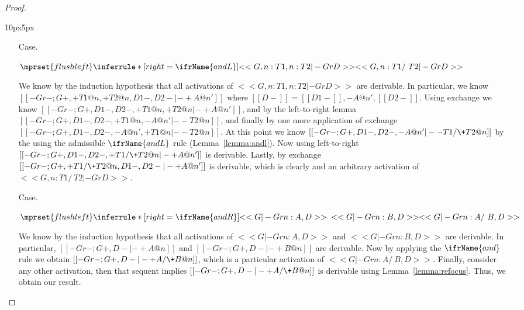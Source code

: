 \begin{proof}
\begin{changemargin}{10px}{5px}
\begin{itemize}
  \item[Case.]\ \\ 
    \begin{center}
      \begin{math}
        $$\mprset{flushleft}
        \inferrule* [right=\ifrName{andL}] {
          <<G , n : T1, n : T2 |- Gr D>>
        }{<<G , n : T1 /\ T2   |- Gr D>>}
      \end{math}
    \end{center}
        We know by the induction hypothesis that all activations of $<<G , n : T1, n : T2 |- Gr D>>$
    are derivable.  In particular, we know $[[-Gr- ; {G}+,+T1@n, +T2@n, {D1}-,{D2}- |- + A @ n']]$ where
    $[[{D}-]] = [[{D1}-]],-A@n',[[{D2}-]]$. Using exchange we know $[[-Gr- ; {G}+,{D1}-,{D2}-,+T1@n, +T2@n |- + A @ n']]$, and
    by the left-to-right lemma $[[-Gr- ; {G}+, {D1}-,{D2}-, +T1@n, - A @ n' |- - T2@n]]$, and finally by one more application
    of exchange \\ $[[-Gr- ; {G}+, {D1}-, {D2}-,- A @ n', +T1@n |- - T2@n]]$.  At this point we know 
    $[[-Gr- ; {G}+, {D1}-, {D2}-, - A @ n' |- - T1 /\+ T2 @ n]]$ by the using the admissible $\ifrName{\normalsize andL}$ rule (Lemma~\ref{lemma:andl}).
    Now using left-to-right \\
    $[[-Gr- ; {G}+, {D1}-, {D2}-, + T1 /\+ T2 @ n  |- + A @ n']]$ is derivable. Lastly, by exchange 
    $[[-Gr- ; {G}+, + T1 /\+ T2 @ n, {D1}-, {D2}- |- + A @ n']]$ is derivable, which is clearly and an arbitrary
    activation of $<<G , n : T1 /\ T2   |- Gr D>>$.

  \item[Case.]\ \\ 
    \begin{center}
      \begin{math}
        $$\mprset{flushleft}
        \inferrule* [right=\ifrName{andR}] {
          <<G |- Gr n : A, D>>
          \\\\
          <<G |- Gr n : B, D>>
        }{<<G |- Gr n : A /\ B, D>>}
      \end{math}
    \end{center}
    We know by the induction hypothesis that all activations of $<<G |- Gr n : A, D>>$ and
    $<<G |- Gr n : B, D>>$ are derivable.  In particular, $[[-Gr- ; {G}+,{D}- |- +A @ n]]$
    and $[[-Gr- ; {G}+,{D}- |- +B @ n]]$ are derivable. Now by applying the $\ifrName{\normalsize and}$ rule
    we obtain $[[-Gr- ; {G}+,{D}- |- + A /\+ B @ n]]$, which is a particular activation of 
    $<<G |- Gr n : A /\ B, D>>$. Finally, consider any other activation, then that sequent implies 
    $[[-Gr- ; {G}+,{D}- |- + A /\+ B @ n]]$ is derivable using Lemma~\ref{lemma:refocus}.  
    Thus, we obtain our result.


\end{itemize}
\end{changemargin}
\end{proof}
